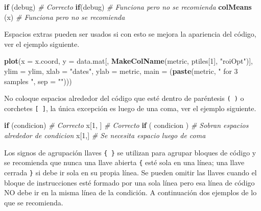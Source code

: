 \documentclass[10pt,]{krantz}
\makeatletter
\newenvironment{Shaded}{\begin{snugshade}}{\end{snugshade}}
\newcommand{\KeywordTok}[1]{\textcolor[rgb]{0.13,0.29,0.53}{\textbf{#1}}}
\newcommand{\DataTypeTok}[1]{\textcolor[rgb]{0.13,0.29,0.53}{#1}}
\newcommand{\DecValTok}[1]{\textcolor[rgb]{0.00,0.00,0.81}{#1}}
\newcommand{\StringTok}[1]{\textcolor[rgb]{0.31,0.60,0.02}{#1}}
\newcommand{\CommentTok}[1]{\textcolor[rgb]{0.56,0.35,0.01}{\textit{#1}}}
\newcommand{\ControlFlowTok}[1]{\textcolor[rgb]{0.13,0.29,0.53}{\textbf{#1}}}
\newcommand{\NormalTok}[1]{#1}
\newenvironment{kframe}{%
\medskip{}
\setlength{\fboxsep}{.8em}
 \def\at@end@of@kframe{}%
 \ifinner\ifhmode%
  \def\at@end@of@kframe{\end{minipage}}%
  \begin{minipage}{\columnwidth}%
 \fi\fi%
 \def\FrameCommand##1{\hskip\@totalleftmargin \hskip-\fboxsep
 \colorbox{shadecolor}{##1}\hskip-\fboxsep
     \hskip-\linewidth \hskip-\@totalleftmargin \hskip\columnwidth}%
 \MakeFramed {\advance\hsize-\width
   \@totalleftmargin\z@ \linewidth\hsize
   \@setminipage}}%
 {\par\unskip\endMakeFramed%
 \at@end@of@kframe}
\renewenvironment{Shaded}{\begin{kframe}}{\end{kframe}}
\makeatother
\begin{document}
\begin{Shaded}
\begin{Highlighting}[]
\ControlFlowTok{if}\NormalTok{ (debug)    }\CommentTok{# Correcto}
\ControlFlowTok{if}\NormalTok{(debug)     }\CommentTok{# Funciona pero no se recomienda}
\KeywordTok{colMeans}\NormalTok{ (x)  }\CommentTok{# Funciona pero no se recomienda}
\end{Highlighting}
\end{Shaded}

Espacios extras pueden ser usados si con esto se mejora la apariencia
del código, ver el ejemplo siguiente.

\begin{Shaded}
\begin{Highlighting}[]
\KeywordTok{plot}\NormalTok{(}\DataTypeTok{x    =}\NormalTok{ x.coord,}
     \DataTypeTok{y    =}\NormalTok{ data.mat[, }\KeywordTok{MakeColName}\NormalTok{(metric, ptiles[}\DecValTok{1}\NormalTok{], }\StringTok{"roiOpt"}\NormalTok{)],}
     \DataTypeTok{ylim =}\NormalTok{ ylim,}
     \DataTypeTok{xlab =} \StringTok{"dates"}\NormalTok{,}
     \DataTypeTok{ylab =}\NormalTok{ metric,}
     \DataTypeTok{main =}\NormalTok{ (}\KeywordTok{paste}\NormalTok{(metric, }\StringTok{" for 3 samples "}\NormalTok{, }\DataTypeTok{sep =} \StringTok{""}\NormalTok{)))}
\end{Highlighting}
\end{Shaded}

No coloque espacios alrededor del código que esté dentro de paréntesis
\texttt{(\ )} o corchetes \texttt{{[}\ {]}}, la única excepción es luego
de una coma, ver el ejemplo siguiente.

\begin{Shaded}
\begin{Highlighting}[]
\ControlFlowTok{if}\NormalTok{ (condicion)    }\CommentTok{# Correcto }
\NormalTok{x[}\DecValTok{1}\NormalTok{, ]            }\CommentTok{# Correcto}
\ControlFlowTok{if}\NormalTok{ ( condicion )  }\CommentTok{# Sobran espacios alrededor de condicion}
\NormalTok{x[}\DecValTok{1}\NormalTok{,]             }\CommentTok{# Se necesita espacio luego de coma}
\end{Highlighting}
\end{Shaded}

Los signos de agrupación llaves \texttt{\{\ \}} se utilizan para agrupar
bloques de código y se recomienda que nunca una llave abierta
\texttt{\{} esté sola en una línea; una llave cerrada \texttt{\}} si
debe ir sola en su propia línea. Se pueden omitir las llaves cuando el
bloque de instrucciones esté formado por una sola línea pero esa línea
de código NO debe ir en la misma línea de la condición. A continuación
dos ejemplos de lo que se recomienda.
\end{document}
